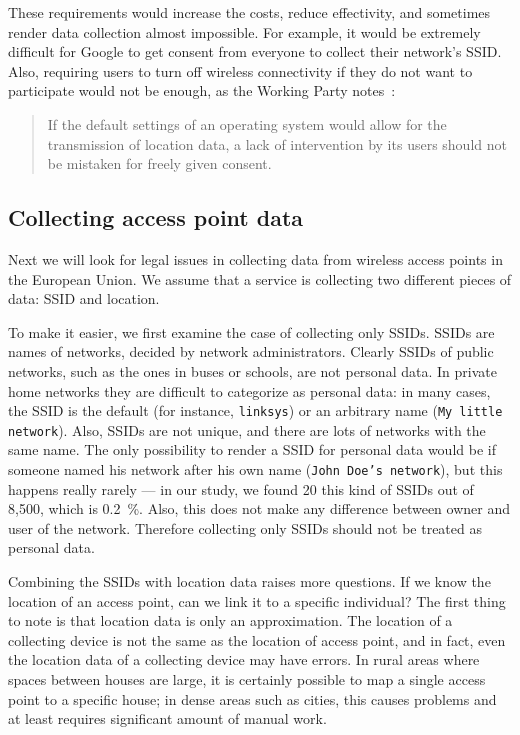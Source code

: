 \documentclass[12pt,a4paper,oneside,pdftex]{report}
\begin{document}
These requirements would increase the costs, reduce effectivity, and sometimes render data collection almost impossible. For example, it would be extremely difficult for Google to get consent from everyone to collect their network's SSID. Also, requiring users to turn off wireless connectivity if they do not want to participate would not be enough, as the Working Party notes~\cite{wp29_185}:
\begin{quote}
    If the default settings of an operating system would allow for the transmission of location data, a lack of intervention by its users should not be mistaken for freely given consent.
\end{quote}


\subsection{Collecting access point data}
\label{subsec:eu_collect}

Next we will look for legal issues in collecting data from wireless access points in the European Union. We assume that a service is collecting two different pieces of data: SSID and location.

To make it easier, we first examine the case of collecting only SSIDs. SSIDs are names of networks, decided by network administrators. Clearly SSIDs of public networks, such as the ones in buses or schools, are not personal data. In private home networks they are difficult to categorize as personal data: in many cases, the SSID is the default (for instance, \texttt{linksys}) or an arbitrary name (\texttt{My little network}). Also, SSIDs are not unique, and there are lots of networks with the same name. The only possibility to render a SSID for personal data would be if someone named his network after his own name (\texttt{John Doe's network}), but this happens really rarely --- in our study, we found 20 this kind of SSIDs out of 8,500, which is 0.2~\%. Also, this does not make any difference between owner and user of the network. Therefore collecting only SSIDs should not be treated as personal data.

Combining the SSIDs with location data raises more questions. If we know the location of an access point, can we link it to a specific individual? The first thing to note is that location data is only an approximation. The location of a collecting device is not the same as the location of access point, and in fact, even the location data of a collecting device may have errors. In rural areas where spaces between houses are large, it is certainly possible to map a single access point to a specific house; in dense areas such as cities, this causes problems and at least requires significant amount of manual work.
\end{document}
